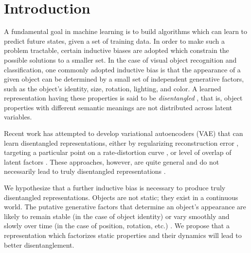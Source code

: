 \section{Introduction}

A fundamental goal in machine learning is to build algorithms which can learn to predict future states, given a set of training data. In order to make such a problem tractable, certain inductive biases are adopted which constrain the possible solutions to a smaller set. In the case of visual object recognition and classification, one commonly adopted inductive bias is that the appearance of a given object can be determined by a small set of independent generative factors, such as the object’s identity, size, rotation, lighting, and color. A learned representation having these properties is said to be \textit{disentangled} \cite{DiCarlo2007,Bengio2009}, that is, object properties with different semantic meanings are not distributed across latent variables.

Recent work has attempted to develop variational autoencoders (VAE) \cite{Kingma2014} that can learn disentangled representations, either by regularizing reconstruction error \cite{Higgins2017}, targeting a particular point on a rate-distortion curve \cite{Alemi2017}, or level of overlap of latent factors \cite{Mathieu2018}. These approaches, however, are quite general and do not necessarily lead to truly disentangled representations \cite{Alemi2017,Mathieu2018}.

We hypothesize that a further inductive bias is necessary to produce truly disentangled representations. Objects are not static; they exist in a continuous world. The putative generative factors that determine an object’s appearance are likely to remain stable (in the case of object identity) or vary smoothly and slowly over time (in the case of position, rotation, etc.) \cite{Wiskott2002}. We propose that a representation which factorizes static properties and their dynamics will lead to better disentanglement.

